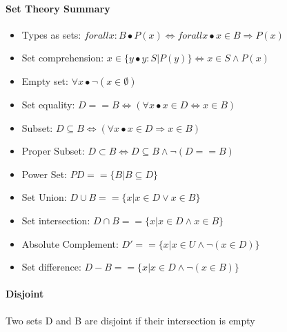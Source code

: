\documentclass[12pt]{report}
\begin{document}
    \paragraph{Set Theory Summary}
    \begin{itemize}
      \item Types as sets: $ forall x : B \bullet P(x) \Leftrightarrow forall x
        \bullet x \in B \Rightarrow P(x) $
      \item Set comprehension: $ x \in \{ y \bullet y : S | P(y) \}
        \Leftrightarrow x \in S \land P(x) $
      \item Empty set: $ \forall x \bullet \lnot ( x \in \emptyset ) $
      \item Set equality: $ D == B \Leftrightarrow ( \forall x \bullet x \in D
        \Leftrightarrow x \in B ) $
      \item Subset: $ D \subseteq B \Leftrightarrow ( \forall x \bullet x \in D
        \Rightarrow x \in B ) $
      \item Proper Subset: $ D \subset B \Leftrightarrow D \subseteq B \land
        \lnot ( D == B ) $
      \item Power Set: $ PD == \{ B | B \subseteq D \} $
      \item Set Union: $ D \cup B == \{ x | x \in D \lor x \in B \} $
      \item Set intersection: $ D \cap B == \{ x | x \in D \land x \in B \} $
      \item Absolute Complement: $D' == \{ x | x \in U \land \lnot ( x \in D )
        \} $
      \item Set difference: $ D - B == \{ x | x \in D \land \lnot ( x \in B )
        \} $
    \end{itemize}

    \paragraph{Disjoint} Two sets D and B are disjoint if their intersection is
    empty
\end{document}
